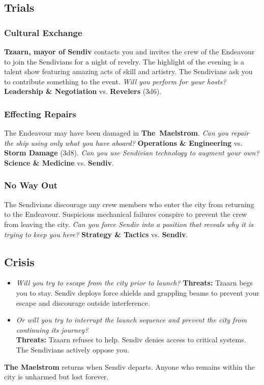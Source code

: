 \documentclass[11pt, a5paper, parskip=half-, DIV=12]{scrartcl}
\begin{document}
\subsection*{Trials}
\subsubsection*{Cultural Exchange}
\textbf{Tzaarn, mayor of Sendiv} contacts you and invites the crew of the Endeavour to join the Sendivians for a night of revelry. The highlight of the evening is a talent show featuring amazing acts of skill and artistry. The Sendivians ask you to contribute something to the event. \textit{Will you perform for your hosts?}
\textbf{Leadership \& Negotiation} vs. \textbf{Revelers} (3d6).

\subsubsection*{Effecting Repairs}
The Endeavour may have been damaged in \textbf{The~Maelstrom}. \textit{Can you repair the ship using only what you have aboard?}
\textbf{Operations \& Engineering} vs. \textbf{Storm Damage} (3d8). \textit{Can you use Sendivian technology to augment your own?} \textbf{Science \& Medicine} vs. \textbf{Sendiv}.

\subsubsection*{No Way Out}
The Sendivians discourage any crew members who enter the city from returning to the Endeavour.  Suspicious mechanical failures conspire to prevent the crew from leaving the city. \textit{Can you force Sendiv into a position that reveals why it is trying to keep you here?}
\textbf{Strategy \& Tactics} vs. \textbf{Sendiv}.


\subsection*{Crisis}
\begin{itemize}
	\item \textit{Will you try to escape from the city prior to launch?} \textbf{Threats:} Tzaarn begs you to stay. Sendiv deploys force shields and grappling beams to prevent your escape and discourage outside interference.
	\item \textit{Or will you try to interrupt the launch sequence and prevent the city from continuing its journey?} \\ \textbf{Threats:} Tzaarn refuses to help. Sendiv denies access to critical systems. The Sendivians actively oppose you.
\end{itemize}
\textbf{The Maelstrom} returns when Sendiv departs. Anyone who remains within the city is unharmed but lost forever.
\end{document}

